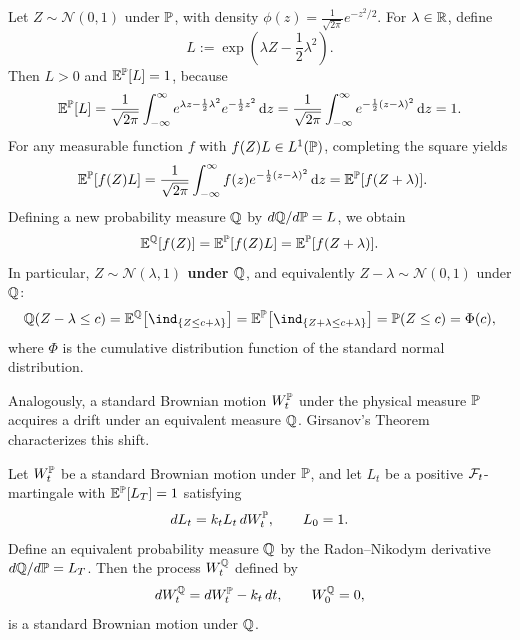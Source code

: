 \begin{example}
    \label{ex:ch04-gaussian-shift}
    Let $Z \sim \mathcal{N}(0, 1)$ under $\mathbb{P}$, with density $\phi(z) = \frac{1}{\sqrt{2\pi}} e^{-z^2/2}$. For $\lambda \in \mathbb{R}$, define
    \[
        L := \exp\!\left(\lambda Z - \frac{1}{2}\lambda^2\right).
    \]
    Then $L > 0$ and $\mathbb{E}^{\mathbb{P}}[L] = 1$, because
    \[
        \mathbb{E}^{\mathbb{P}}[L]
        = \frac{1}{\sqrt{2\pi}} \int_{-\infty}^{\infty} e^{\lambda z - \frac{1}{2}\lambda^2} e^{-\frac{1}{2}z^2}\,\mathrm{d} z
        = \frac{1}{\sqrt{2\pi}} \int_{-\infty}^{\infty} e^{-\frac{1}{2}(z - \lambda)^2}\,\mathrm{d} z = 1.
    \]
    For any measurable function $f$ with $f(Z)L \in L^1(\mathbb{P})$, completing the square yields
    \begin{align*}
        \mathbb{E}^{\mathbb{P}}[f(Z) L]
        &= \frac{1}{\sqrt{2\pi}} \int_{-\infty}^{\infty} f(z) e^{-\frac{1}{2}(z - \lambda)^2}\,\mathrm{d} z
        = \mathbb{E}^{\mathbb{P}}[f(Z + \lambda)].
    \end{align*}
    Defining a new probability measure $\mathbb{Q}$ by $d\mathbb{Q}/d\mathbb{P} = L$, we obtain
    \[
        \mathbb{E}^{\mathbb{Q}}[f(Z)] = \mathbb{E}^{\mathbb{P}}[f(Z) L] = \mathbb{E}^{\mathbb{P}}[f(Z + \lambda)].
    \]
    In particular, \textbf{$Z \sim \mathcal{N}(\lambda, 1)$ under $\mathbb{Q}$}, and equivalently $Z - \lambda \sim \mathcal{N}(0, 1)$ under $\mathbb{Q}$:
    \[
        \Q(Z - \lambda \le c)
        = \E^{\Q}\bigl[\ind_{\{Z \le c + \lambda\}}\bigr]
        = \E^{\Prob}\bigl[\ind_{\{Z + \lambda \le c + \lambda\}}\bigr]
        = \Prob(Z \le c) = \Phi(c),
    \]
    where $\Phi$ is the cumulative distribution function of the standard normal distribution.
\end{example}

Analogously, a standard Brownian motion $W_t^{\mathbb{P}}$ under the physical measure $\mathbb{P}$ acquires a drift under an equivalent measure $\mathbb{Q}$. Girsanov's Theorem characterizes this shift.

\begin{theorem}
    \label{thm:ch04-girsanov}
    Let $W_t^{\mathbb{P}}$ be a standard Brownian motion under $\mathbb{P}$, and let $L_t$ be a positive $\mathcal{F}_t$-martingale with $\mathbb{E}^{\mathbb{P}}[L_T] = 1$ satisfying
    \[
        dL_t = k_t L_t\,dW_t^{\mathbb{P}}, \qquad L_0 = 1.
    \]
    Define an equivalent probability measure $\mathbb{Q}$ by the Radon--Nikodym derivative $d\mathbb{Q}/d\mathbb{P} = L_T$. Then the process $W_t^{\mathbb{Q}}$ defined by
    \[
        dW_t^{\mathbb{Q}} = dW_t^{\mathbb{P}} - k_t\,dt, \qquad W_0^{\mathbb{Q}} = 0,
    \]
    is a standard Brownian motion under $\mathbb{Q}$.
\end{theorem}

